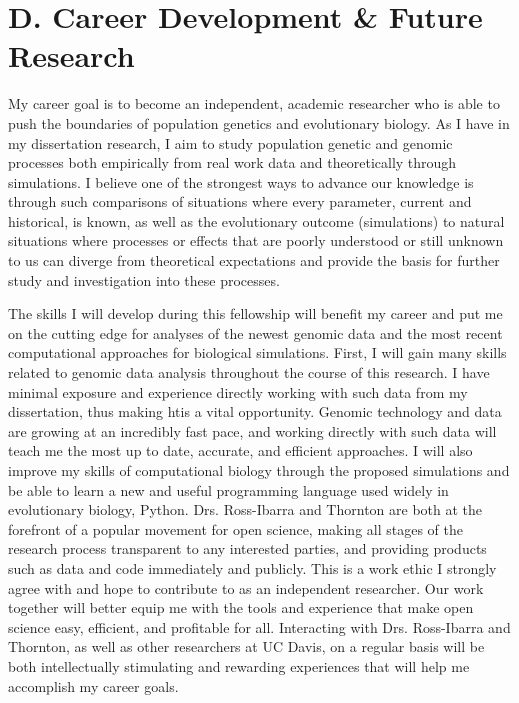 \section*{D. Career Development \& Future Research}

My career goal is to become an independent, academic researcher who is able to push the boundaries of population genetics and evolutionary biology. As I have in my dissertation research, I aim to study population genetic and genomic processes both empirically from real work data and theoretically through simulations. I believe one of the strongest ways to advance our knowledge is through such comparisons of situations where every parameter, current and historical, is known, as well as the evolutionary outcome (simulations) to natural situations where processes or effects that are poorly understood or still unknown to us can diverge from theoretical expectations and provide the basis for further study and investigation into these processes.

The skills I will develop during this fellowship will benefit my career and put me on the cutting edge for analyses of the newest genomic data and the most recent computational approaches for biological simulations. First, I will gain many skills related to genomic data analysis throughout the course of this research. I have minimal exposure and experience directly working with such data from my dissertation, thus making htis a vital opportunity. Genomic technology and data are growing at an incredibly fast pace, and working directly with such data will teach me the most up to date, accurate, and efficient approaches. I will also improve my skills of computational biology through the proposed simulations and be able to learn a new and useful programming language used widely in evolutionary biology, Python. Drs. Ross\--Ibarra and Thornton are both at the forefront of a popular  movement for open science, making all stages of the research process transparent to any interested parties, and providing products such as data and code immediately and publicly. This is a work ethic I strongly agree with and hope to contribute to as an independent researcher. Our work together will better equip me with the tools and experience that make open science easy, efficient, and profitable for all. Interacting with Drs. Ross\--Ibarra and Thornton, as well as other researchers at UC Davis, on a regular basis will be both intellectually stimulating and rewarding experiences that will help me accomplish my career goals.



